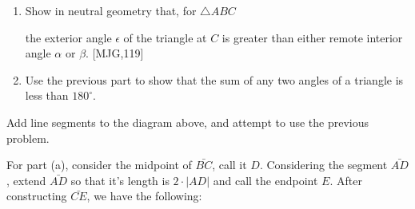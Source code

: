 \documentclass[instructornotes]{ximera}
\begin{document}
\begin{problem}\hfil
\label{118} 
\begin{enumerate}
\item\label{Exp:ExtAngle} Show in neutral geometry that, for $\triangle ABC$
\begin{image}
\end{image}
the exterior angle $\epsilon$ of the triangle at $C$ is greater than
either remote interior angle $\alpha$ or $\beta$. [MJG,119]
\item Use the previous part to show that the sum of any two angles of
  a triangle is less than $180^{\circ}$.
\end{enumerate}

\begin{hint}
Add line segments to the diagram above, and attempt to use the
previous problem.
\end{hint}
\begin{freeResponse} 
For part (a), consider the midpoint of $\bar{BC}$, call it
$D$. Considering the segment $\bar{AD}$, extend $\bar{AD}$ so that
it's length is $2\cdot|AD|$ and call the endpoint $E$. After
constructing $\bar{CE}$, we have the following:
\begin{image}
\end{image}
\end{freeResponse}
\end{problem}
\end{document}
